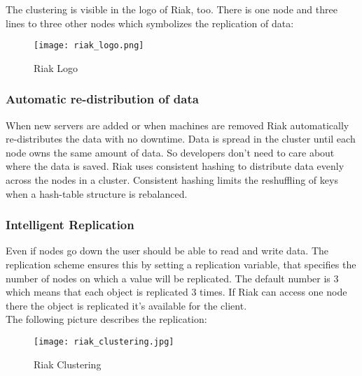 The clustering is visible in the logo of Riak, too. There is one node and three lines to three other nodes which symbolizes the replication of data:
\begin{figure}[h!]
	\centering
	\texttt{[image: riak\_logo.png]}
	\caption{Riak Logo}
	\label{Riak Logo}
\end{figure}

\subsubsection{Automatic re-distribution of data}
When new servers are added or when machines are removed  Riak automatically re-distributes the data with no downtime. Data is spread in the cluster until each node owns the same amount of data. So developers don't need to care about where the data is saved. Riak uses consistent hashing to distribute data evenly across the nodes in a cluster. Consistent hashing limits the reshuffling of keys when a hash-table structure is rebalanced.
\subsubsection{Intelligent Replication}
Even if nodes go down the user should be able to read and write data. The replication scheme ensures this by setting a replication variable, that specifies the number of nodes on which a value will be replicated. The default number is 3 which means that each object is replicated 3 times. If Riak can access one node there the object is replicated it's available for the client.
\\ 
The following picture describes the replication: 
\begin{figure}[h]
	\centering
	\texttt{[image: riak\_clustering.jpg]}
	\caption{Riak Clustering}
	\label{Riak Clustering}
\end{figure}